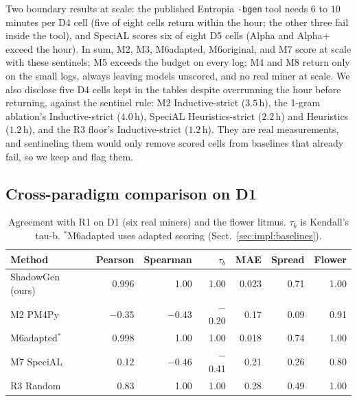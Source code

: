 \documentclass[runningheads]{llncs}
\newcommand{\chg}[1]{\textcolor{chgblue}{#1}}
\begin{document}
\chg{Two boundary results at scale: the published Entropia \texttt{-bgen} tool needs $6$ to $10$ minutes per D4 cell (five of eight cells return within the hour; the other three fail inside the tool), and SpeciAL scores six of eight D5 cells (Alpha and Alpha+ exceed the hour). In sum, M2, M3, M6adapted, M6original, and M7 score at scale with these sentinels; M5 exceeds the budget on every log; M4 and M8 return only on the small logs, always leaving models unscored, and no real miner at scale. We also disclose five D4 cells kept in the tables despite overrunning the hour before returning, against the sentinel rule: M2 Inductive-strict ($3.5$\,h), the 1-gram ablation's Inductive-strict ($4.0$\,h), SpeciAL Heuristics-strict ($2.2$\,h) and Heuristics ($1.2$\,h), and the R3 floor's Inductive-strict ($1.2$\,h). They are real measurements, and sentineling them would only remove scored cells from baselines that already fail, so we keep and flag them.}

\subsection{Cross-paradigm comparison on D1}
\label{sec:eval:external}


\begin{table}[t]
\centering
\caption{Agreement with R1 on D1 (six real miners) and the flower litmus. $\tau_b$ is Kendall's tau-b. \chg{$^{*}$M6adapted uses adapted scoring (Sect.~\ref{sec:impl:baselines}).}}
\label{tab:corr}
\setlength{\tabcolsep}{4.5pt}
\footnotesize
\begin{tabular}{@{}lrrrrrr@{}}
\toprule
Method & Pearson & Spearman & $\tau_b$ & MAE & Spread & Flower \\
\midrule
\chg{ShadowGen (ours)}  & 0.996 & 1.00 & 1.00 & 0.023 & 0.71 & 1.00 \\
M2 PM4Py         & $-$0.35 & $-$0.43 & $-$0.20 & 0.17 & 0.09 & 0.91 \\
M6adapted$^{*}$ & 0.998 & 1.00 & 1.00 & 0.018 & 0.74 & 1.00 \\
M7 SpeciAL       & 0.12 & $-$0.46 & $-$0.41 & 0.21 & 0.26 & 0.80 \\
R3 Random        & 0.83 & 1.00 & 1.00 & 0.28 & 0.49 & 1.00 \\
\bottomrule
\end{tabular}
\end{table}
\end{document}
